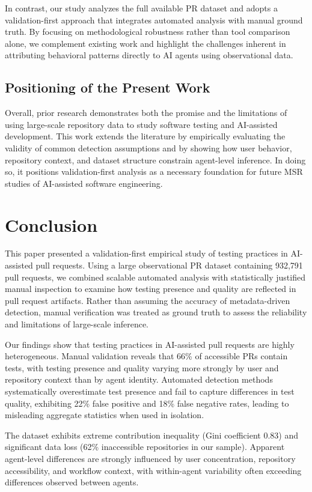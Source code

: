 \documentclass[conference]{IEEEtran}
\begin{document}
In contrast, our study analyzes the full available PR dataset and adopts a validation-first approach that integrates automated analysis with manual ground truth. By focusing on methodological robustness rather than tool comparison alone, we complement existing work and highlight the challenges inherent in attributing behavioral patterns directly to AI agents using observational data.

\subsection{Positioning of the Present Work}

Overall, prior research demonstrates both the promise and the limitations of using large-scale repository data to study software testing and AI-assisted development. This work extends the literature by empirically evaluating the validity of common detection assumptions and by showing how user behavior, repository context, and dataset structure constrain agent-level inference. In doing so, it positions validation-first analysis as a necessary foundation for future MSR studies of AI-assisted software engineering.

\section{Conclusion}

This paper presented a validation-first empirical study of testing practices in AI-assisted pull requests. Using a large observational PR dataset containing 932,791 pull requests, we combined scalable automated analysis with statistically justified manual inspection to examine how testing presence and quality are reflected in pull request artifacts. Rather than assuming the accuracy of metadata-driven detection, manual verification was treated as ground truth to assess the reliability and limitations of large-scale inference.

Our findings show that testing practices in AI-assisted pull requests are highly heterogeneous. Manual validation reveals that 66\% of accessible PRs contain tests, with testing presence and quality varying more strongly by user and repository context than by agent identity. Automated detection methods systematically overestimate test presence and fail to capture differences in test quality, exhibiting 22\% false positive and 18\% false negative rates, leading to misleading aggregate statistics when used in isolation. 

The dataset exhibits extreme contribution inequality (Gini coefficient 0.83) and significant data loss (62\% inaccessible repositories in our sample). Apparent agent-level differences are strongly influenced by user concentration, repository accessibility, and workflow context, with within-agent variability often exceeding differences observed between agents.
\end{document}
